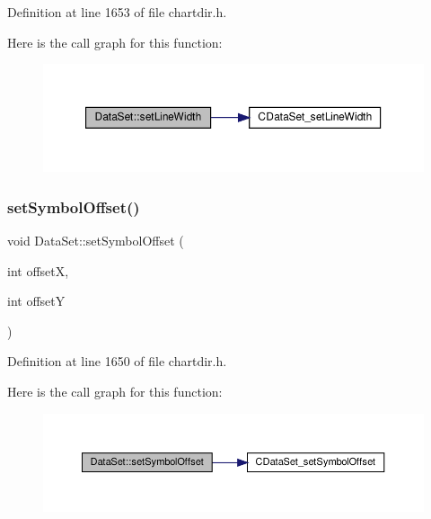 Definition at line 1653 of file chartdir.\+h.

Here is the call graph for this function\+:
\nopagebreak
\begin{figure}[H]
\begin{center}
\leavevmode
\includegraphics[width=350pt]{class_data_set_a6435ee82c7223faf3547cff475db3632_cgraph}
\end{center}
\end{figure}
\mbox{\label{class_data_set_a943a5f94f0f09001f20318bdff3936a5}} 
\subsubsection{\texorpdfstring{set\+Symbol\+Offset()}{setSymbolOffset()}}
{\footnotesize\ttfamily void Data\+Set\+::set\+Symbol\+Offset (\begin{DoxyParamCaption}\item[{int}]{offsetX,  }\item[{int}]{offsetY }\end{DoxyParamCaption})\hspace{0.3cm}{\ttfamily [inline]}}



Definition at line 1650 of file chartdir.\+h.

Here is the call graph for this function\+:
\nopagebreak
\begin{figure}[H]
\begin{center}
\leavevmode
\includegraphics[width=350pt]{class_data_set_a943a5f94f0f09001f20318bdff3936a5_cgraph}
\end{center}
\end{figure}
\mbox{\label{class_data_set_a513df1915a715e378637ac4171c53a58}} 
